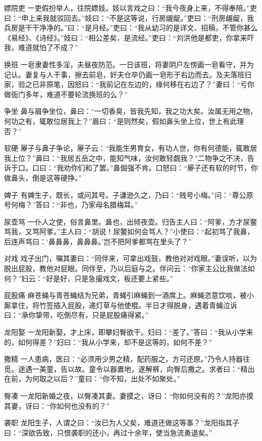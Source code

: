 \documentclass[12pt,UTF8]{ctexbook}
\begin{document}
嫖院吏
一吏假扮举人，往院嫖妓。妓以言戏之曰：“我今夜身上来，不得奉陪。”吏曰：“申上来我就驳回去。”妓曰：“不是这等说，行房龌龊。”吏曰：“刑房龌龊，我兵房是干干净净的。”曰：“是月经。”吏曰：“我从幼习的是详文、招稿，不管你甚么《易经》、《诗经》。”妓曰：“相公差矣，是流经。”吏曰：“刘洪他是都吏，你拿来吓我，难道就怕了不成？”

换班
一皂隶妻性多淫，夫昼夜防范。一日该班，将妻阴户左傍画一皂看守，并为记认。妻复与人干事，擦去前皂，奸夫仓卒仍画一皂形于右边而去。及夫落班归家，验之已非原笔，因怒曰：“我前记在左边的，缘何移在右边了？”妻曰：“亏你做衙门多年，难道不要轮流换班的么？”

争坐
鼻与眉争坐位，鼻曰：“一切香臭，皆我先知，我之功大矣。汝属无用之物，何功之有，辄敢位居我上？”眉曰：“是则然矣，假如鼻头坐上位，世上有此理否？”

软硬
屪子与鼻子争论，屪子云：“我能生男育女，有功人世，你有何德能，辄敢居我上位？”鼻曰：“我居五岳之中，能知气味，汝何敢轻觑我？”二物争之不决，告诉于口。口曰：“我劝你们和了罢。”鼻倔强不肯。口怒曰：“屪子还有软的时节，你做鼻头，倒是这等硬挣。”

婢子
有婢生子，既长，或问其号。子谦逊久之，乃曰：“贱号小梅。”问：“尊公原号何梅？”答曰：“非也，乃家母名腊梅耳。”

尿壶骂
一仆人之使，俗言鼻里。鼻也，出倾夜壶。归告主人曰：“阿爹，方才尿鳖骂我，又骂阿爹。”主人曰：“胡说！尿鳖如何会骂人？”小使曰：“起初骂了我鼻，后连声骂曰：‘鼻鼻鼻，鼻鼻鼻。’岂不把阿爹都骂在里头了？”

对戏
戏子出门，嘱其妻曰：“同伴来，可拿出戏鼓，教他对对戏眼。”妻误听，以为脱出屁股，教他对屁眼。同伴至，乃以后庭与之。伴问云：“你家主公比我做法如何？”妇云：“好是好，只是急撮戏文，板还要上紧些。”

屁股痛
麻苍蝇与青苍蝇结为兄弟，青蝇引麻蝇到一酒席上。麻蝇恣意饮啖，被小厮拿住，将竹签插入屁股，递灯草与他使棍。半日才得脱身，遇着青蝇泣诉曰：“承你挚带，吃倒尽有，只是屁股痛得紧。”

龙阳娶
一龙阳新娶，才上床，即攀妇臀欲干。妇曰：“差了。”答曰：“我从小学来的，如何得差？”妇曰：“我从小学来，却不是这等的，如何不差？”

撒精
一人患病，医曰：“必须用少男之精，配药服之，方可还原。”乃令人持器往觅。途遇一美童，告以故。童令以器置地，遂解裤，向臀后撒之。求者曰：“精出在前，为何取之以后？”童曰：“你不知，出处不如聚处。”

臀凑
一龙阳新婚之夜，以臀凑其妻。妻摸之，讶曰：“你如何没有的？”龙阳亦摸其妻，讶曰：“你如何也没有的？”

袭职
龙阳生子，人谓之曰：“汝已为人父矣，难道还做这等事？”龙阳指其子曰：“深欲告致，只恨袭职的还小，再过十余年，使当急流勇退矣。”
\end{document}
